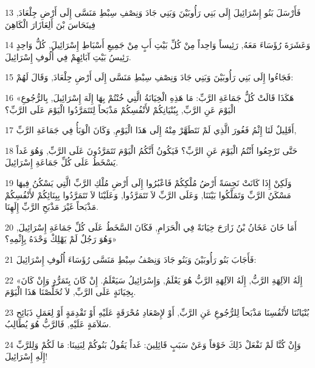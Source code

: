 \par 13 فَأَرْسَلَ بَنُو إِسْرَائِيلَ إِلَى بَنِي رَأُوبَيْنَ وَبَنِي جَادَ وَنِصْفِ سِبْطِ مَنَسَّى إِلَى أَرْضِ جِلْعَادَ, فِينَحَاسَ بْنَ أَلِعَازَارَ الْكَاهِنَ
\par 14 وَعَشَرَةَ رُؤَسَاءَ مَعَهُ, رَئِيساً وَاحِداً مِنْ كُلِّ بَيْتِ أَبٍ مِنْ جَمِيعِ أَسْبَاطِ إِسْرَائِيلَ, كُلُّ وَاحِدٍ رَئِيسُ بَيْتِ آبَائِهِمْ فِي أُلُوفِ إِسْرَائِيلَ.
\par 15 فَجَاءُوا إِلَى بَنِي رَأُوبَيْنَ وَبَنِي جَادَ وَنِصْفِ سِبْطِ مَنَسَّى إِلَى أَرْضِ جِلْعَادَ, وَقَالَ لَهُمْ:
\par 16 «هَكَذَا قَالَتْ كُلُّ جَمَاعَةِ الرَّبِّ: مَا هَذِهِ الْخِيَانَةُ الَّتِي خُنْتُمْ بِهَا إِلَهَ إِسْرَائِيلَ, بِالرُّجُوعِ الْيَوْمَ عَنِ الرَّبِّ, بِبُنْيَانِكُمْ لأَنْفُسِكُمْ مَذْبَحاً لِتَتَمَرَّدُوا الْيَوْمَ عَلَى الرَّبِّ؟
\par 17 أَقَلِيلٌ لَنَا إِثْمُ فَغُورَ الَّذِي لَمْ نَتَطَهَّرْ مِنْهُ إِلَى هَذَا الْيَوْمِ, وَكَانَ الْوَبَأُ فِي جَمَاعَةِ الرَّبِّ,
\par 18 حَتَّى تَرْجِعُوا أَنْتُمُ الْيَوْمَ عَنِ الرَّبِّ؟ فَيَكُونُ أَنَّكُمُ الْيَوْمَ تَتَمَرَّدُونَ عَلَى الرَّبِّ, وَهُوَ غَداً يَسْخَطُ عَلَى كُلِّ جَمَاعَةِ إِسْرَائِيلَ.
\par 19 وَلَكِنْ إِذَا كَانَتْ نَجِسَةً أَرْضُ مُلْكِكُمْ فَاعْبُرُوا إِلَى أَرْضِ مُلْكِ الرَّبِّ الَّتِي يَسْكُنُ فِيهَا مَسْكَنُ الرَّبِّ وَتَمَلَّكُوا بَيْنَنَا, وَعَلَى الرَّبِّ لاَ تَتَمَرَّدُوا, وَعَلَيْنَا لاَ تَتَمَرَّدُوا بِبِنَائِكُمْ لأَنْفُسِكُمْ مَذْبَحاً غَيْرَ مَذْبَحِ الرَّبِّ إِلَهِنَا.
\par 20 أَمَا خَانَ عَخَانُ بْنُ زَارَحَ خِيَانَةً فِي الْحَرَامِ, فَكَانَ السَّخَطُ عَلَى كُلِّ جَمَاعَةِ إِسْرَائِيلَ, وَهُوَ رَجُلٌ لَمْ يَهْلِكْ وَحْدَهُ بِإِثْمِهِ؟»
\par 21 فَأَجَابَ بَنُو رَأُوبَيْنَ وَبَنُو جَادَ وَنِصْفُ سِبْطِ مَنَسَّى رُؤَسَاءَ أُلُوفِ إِسْرَائِيلَ:
\par 22 «إِلَهُ الآلِهَةِ الرَّبُّ, إِلَهُ الآلِهَةِ الرَّبُّ هُوَ يَعْلَمُ, وَإِسْرَائِيلُ سَيَعْلَمُ. إِنْ كَانَ بِتَمَرُّدٍ وَإِنْ كَانَ بِخِيَانَةٍ عَلَى الرَّبِّ, لاَ تُخَلِّصْنَا هَذَا الْيَوْمَ.
\par 23 بُنْيَانُنَا لأَنْفُسِنَا مَذْبَحاً لِلرُّجُوعِ عَنِ الرَّبِّ, أَوْ لإِصْعَادِ مُحْرَقَةٍ عَلَيْهِ أَوْ تَقْدِمَةٍ أَوْ لِعَمَلِ ذَبَائِحِ سَلاَمَةٍ عَلَيْهِ, فَالرَّبُّ هُوَ يُطَالِبُ.
\par 24 وَإِنْ كُنَّا لَمْ نَفْعَلْ ذَلِكَ خَوْفاً وَعَنْ سَبَبٍ قَائِلِينَ: غَداً يَقُولُ بَنُوكُمْ لِبَنِينَا: مَا لَكُمْ وَلِلرَّبِّ إِلَهِ إِسْرَائِيلَ!
